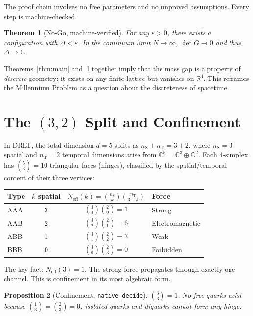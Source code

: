 \documentclass[12pt]{article}
\newtheorem{theorem}{Theorem}[section]
\newtheorem{proposition}[theorem]{Proposition}
\theoremstyle{definition}
\theoremstyle{remark}
\newcommand{\CC}{\mathbb{C}}
\newcommand{\RR}{\mathbb{R}}
\newcommand{\nS}{n_{\mathrm{S}}}
\newcommand{\nT}{n_{\mathrm{T}}}
\newcommand{\Neff}{N_{\mathrm{eff}}}
\begin{document}
The proof chain involves no free parameters and no
unproved assumptions. Every step is machine-checked.

\begin{theorem}[No-Go, machine-verified]\label{thm:nogo}
For any $\varepsilon > 0$, there exists a configuration
with $\Delta < \varepsilon$. In the continuum limit
$N \to \infty$, $\det G \to 0$ and thus $\Delta \to 0$.
\end{theorem}

Theorems~\ref{thm:main} and~\ref{thm:nogo} together
imply that the mass gap is a property of \emph{discrete}
geometry: it exists on any finite lattice but vanishes
on $\RR^4$. This reframes the Millennium Problem as a
question about the discreteness of spacetime.

\section{The $(3,2)$ Split and Confinement}

In DRLT, the total dimension $d = 5$ splits as
$\nS + \nT = 3 + 2$, where $\nS = 3$ spatial and
$\nT = 2$ temporal dimensions arise from
$\CC^5 = \CC^3 \oplus \CC^2$.
Each 4-simplex has $\binom{5}{3} = 10$ triangular
faces (hinges), classified by the spatial/temporal
content of their three vertices:

\begin{center}
\begin{tabular}{lccl}
\toprule
Type & $k$ spatial & $\Neff(k) = \binom{\nS}{k}\binom{\nT}{3-k}$ & Force \\
\midrule
AAA & 3 & $\binom{3}{3}\binom{2}{0} = 1$ & Strong \\
AAB & 2 & $\binom{3}{2}\binom{2}{1} = 6$ & Electromagnetic \\
ABB & 1 & $\binom{3}{1}\binom{2}{2} = 3$ & Weak \\
BBB & 0 & $\binom{3}{0}\binom{2}{3} = 0$ & Forbidden \\
\bottomrule
\end{tabular}
\end{center}

The key fact: $\Neff(3) = 1$. The strong force propagates
through exactly one channel. This is confinement in its
most algebraic form.

\begin{proposition}[Confinement, \texttt{native\_decide}]
$\binom{3}{3} = 1$. No free quarks exist because
$\binom{1}{3} = \binom{2}{3} = 0$: isolated quarks and
diquarks cannot form any hinge.
\end{proposition}
\end{document}
